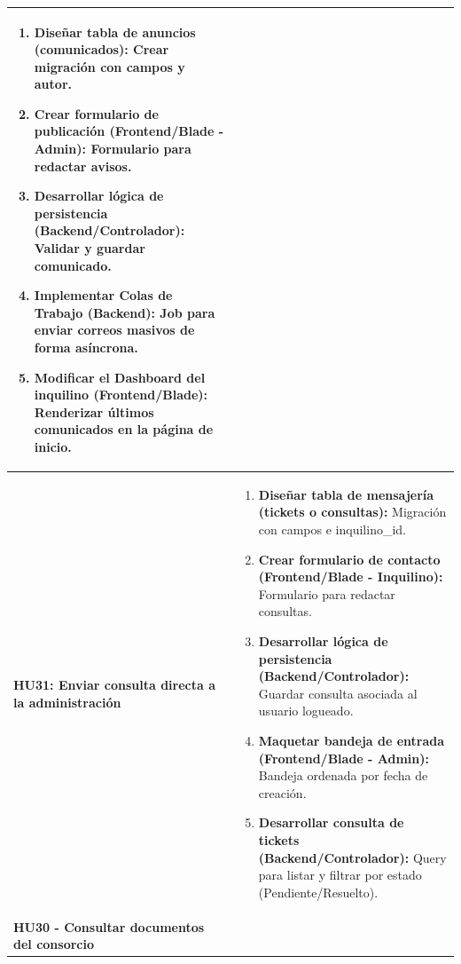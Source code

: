 \begin{longtable}{|p{4.5cm}|p{10.5cm}|}
            \begin{enumerate}[leftmargin=*,nosep]
                \item \textbf{Diseñar tabla de anuncios (comunicados):} Crear migración con campos y autor.
                \item \textbf{Crear formulario de publicación (Frontend/Blade - Admin):} Formulario para redactar avisos.
                \item \textbf{Desarrollar lógica de persistencia (Backend/Controlador):} Validar y guardar comunicado.
                \item \textbf{Implementar Colas de Trabajo (Backend):} Job para enviar correos masivos de forma asíncrona.
                \item \textbf{Modificar el Dashboard del inquilino (Frontend/Blade):} Renderizar últimos comunicados en la página de inicio.
            \end{enumerate} 
        
    \\ \hline

        \textbf{HU31: Enviar consulta directa a la administración} 
        
        & 

            \begin{enumerate}[leftmargin=*,nosep]
                \item \textbf{Diseñar tabla de mensajería (tickets o consultas):} Migración con campos e inquilino\_id.
                \item \textbf{Crear formulario de contacto (Frontend/Blade - Inquilino):} Formulario para redactar consultas.
                \item \textbf{Desarrollar lógica de persistencia (Backend/Controlador):} Guardar consulta asociada al usuario logueado.
                \item \textbf{Maquetar bandeja de entrada (Frontend/Blade - Admin):} Bandeja ordenada por fecha de creación.
                \item \textbf{Desarrollar consulta de tickets (Backend/Controlador):} Query para listar y filtrar por estado (Pendiente/Resuelto).
            \end{enumerate} 
        
    \\ \hline

        \textbf{HU30 - Consultar documentos del consorcio} 
        
        & 


\end{longtable}
